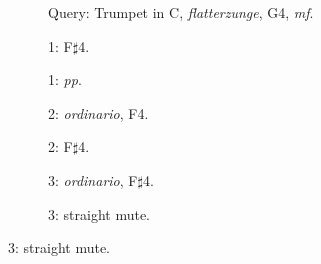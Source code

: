 \begin{figure}
        \newcommand{\scalwidth}{28.0mm}
        \newcommand{\scalheight}{22.1mm}
        \newcommand{\arrowextra}{2mm}

        \begin{subfigure}{\linewidth}
                \centering
                \caption*{Query: Trumpet in C, \emph{flatterzunge}, G4, \emph{mf}.}
                \label{fig:TpC-flatt-G4-mf}
        \end{subfigure}%

        \begin{subfigure}{0.20\textwidth}
                \centering
                \caption*{1: F$\sharp$4.}
                \label{fig:TpC-flatt-Fsh4-mf-left}
        \end{subfigure}%
        \begin{subfigure}{0.20\textwidth}
                \centering
                \caption*{1: \emph{pp}.}
                \label{fig:TpC-flatt-G4-pp}
        \end{subfigure}%

        \begin{subfigure}{0.20\textwidth}
                \centering
                \caption*{2: \emph{ordinario}, F4.}
                \label{fig:TpC-ord-F4-mf}
        \end{subfigure}%
        \begin{subfigure}{0.20\textwidth}
                \centering
                \caption*{2: F$\sharp$4.}
                \label{fig:TpC-flatt-Fsh4-mf-right}
        \end{subfigure}%

        \begin{subfigure}{0.20\textwidth}
                \centering
                \caption*{3: \emph{ordinario}, F$\sharp$4.}
                \label{fig:TpC-ord-Fsh4-mf}
        \end{subfigure}%
        \begin{subfigure}{0.20\textwidth}
                \centering
                \caption*{3: straight mute.}
                \label{fig:TpC+S-flatt-G4-mf}
        \end{subfigure}%


\end{figure}
